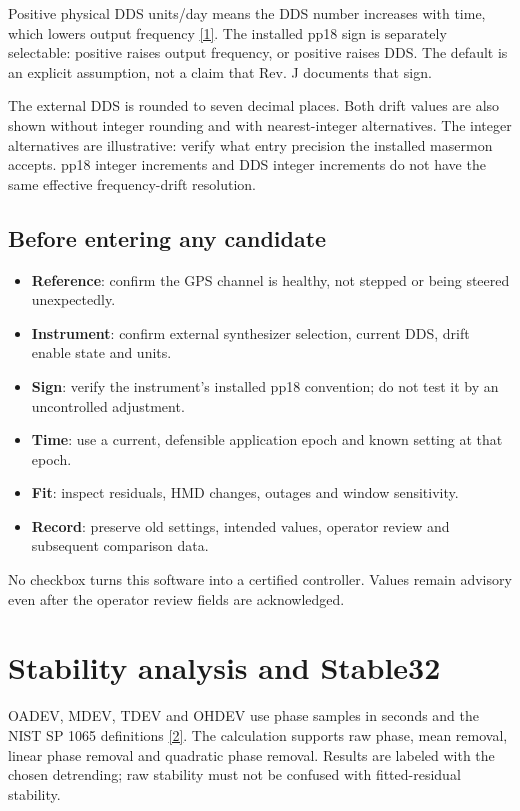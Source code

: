 \documentclass[11pt,a4paper]{article}
\newcommand{\manual}{\href{https://www.gb.nrao.edu/~fghigo/timer/MSMmaser/Maser_UG_75666-201_Rev_J.PDF}{[1]}}
\newcommand{\nist}{\href{https://tf.nist.gov/general/pdf/2220.pdf}{[2]}}
\begin{document}
Positive physical DDS units/day means the DDS number increases with time,
which lowers output frequency \manual. The installed pp18 sign is separately
selectable: positive raises output frequency, or positive raises DDS. The
default is an explicit assumption, not a claim that Rev. J documents that sign.

The external DDS is rounded to seven decimal places. Both drift values are
also shown without integer rounding and with nearest-integer alternatives.
The integer alternatives are illustrative: verify what entry precision the
installed masermon accepts. pp18 integer increments and DDS integer increments
do not have the same effective frequency-drift resolution.

\subsection{Before entering any candidate}
\begin{itemize}
\item \textbf{Reference}: confirm the GPS channel is healthy, not stepped or being steered unexpectedly.
\item \textbf{Instrument}: confirm external synthesizer selection, current DDS, drift enable state and units.
\item \textbf{Sign}: verify the instrument's installed pp18 convention; do not test it by an uncontrolled adjustment.
\item \textbf{Time}: use a current, defensible application epoch and known setting at that epoch.
\item \textbf{Fit}: inspect residuals, HMD changes, outages and window sensitivity.
\item \textbf{Record}: preserve old settings, intended values, operator review and subsequent comparison data.
\end{itemize}

No checkbox turns this software into a certified controller. Values remain
advisory even after the operator review fields are acknowledged.
\clearpage

\section{Stability analysis and Stable32}
OADEV, MDEV, TDEV and OHDEV use phase samples in seconds and the NIST SP 1065
definitions \nist. The calculation supports raw phase, mean removal, linear
phase removal and quadratic phase removal. Results are labeled with the chosen
detrending; raw stability must not be confused with fitted-residual stability.
\end{document}
